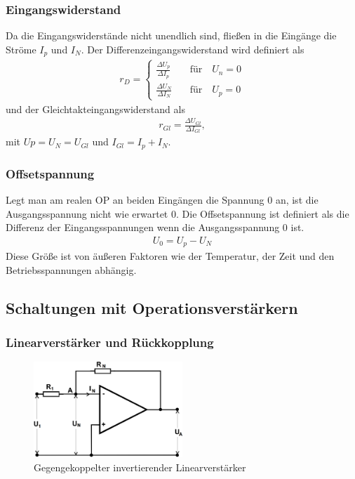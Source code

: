 \subsubsection{Eingangswiderstand}

Da die Eingangswiderstände nicht unendlich sind, fließen in die Eingänge die Ströme $I_p$ und $I_N$.
Der Differenzeingangswiderstand wird definiert als
\begin{align}
	r_D =
	\begin{cases}
		\frac{\Delta U_p}{\Delta I_p} \quad & \text{für} \quad U_n = 0\\
		\frac{\Delta U_N}{\Delta I_N} \quad & \text{für} \quad U_p = 0
	\end{cases}
\end{align}
und der Gleichtakteingangswiderstand als 
\begin{align}
	r_{Gl} = \frac{\Delta U_{Gl}}{\Delta I_{Gl}},
\end{align}
mit $Up = U_N = U_{Gl}$ und $I_{Gl} = I_p + I_N$.

\subsubsection{Offsetspannung}
Legt man am realen OP an beiden Eingängen die Spannung $0$ an, ist die Ausgangsspannung nicht wie erwartet $0$.
Die Offsetspannung ist definiert als die Differenz der Eingangsspannungen wenn die Ausgangsspannung $0$ ist.
\begin{align}
	U_0 = U_p - U_N
\end{align}
Diese Größe ist von äußeren Faktoren wie der Temperatur, der Zeit und den Betriebsspannungen abhängig.

\subsection{Schaltungen mit Operationsverstärkern}

\subsubsection{Linearverstärker und Rückkopplung}

\begin{figure}
	\centering
	\includegraphics[width=0.5\textwidth]{img/linamp.png}
	\caption{Gegengekoppelter invertierender Linearverstärker \cite{v51}}
	\label{fig:linamp}
\end{figure}

